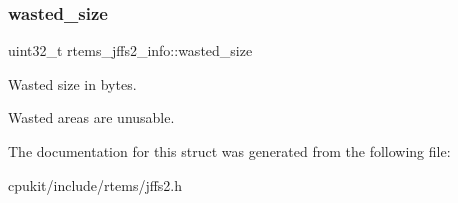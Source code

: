 \subsubsection{\texorpdfstring{wasted\_size}{wasted\_size}}
{\footnotesize\ttfamily uint32\+\_\+t rtems\+\_\+jffs2\+\_\+info\+::wasted\+\_\+size}



Wasted size in bytes. 

Wasted areas are unusable. 

The documentation for this struct was generated from the following file\+:\begin{DoxyCompactItemize}
\item 
cpukit/include/rtems/jffs2.\+h\end{DoxyCompactItemize}
